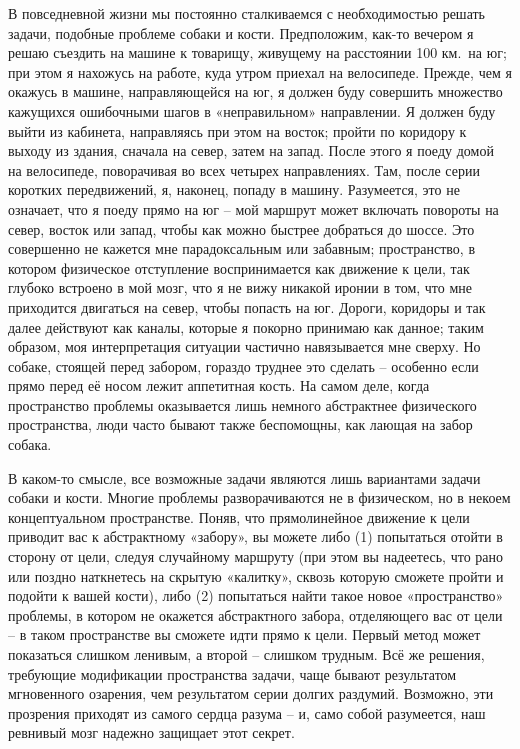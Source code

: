 \documentclass[../main.tex]{subfiles}
\begin{document}
В повседневной жизни мы постоянно сталкиваемся с необходимостью решать задачи, подобные проблеме собаки и кости. Предположим, как-то вечером я решаю съездить на машине к товарищу, живущему на расстоянии 100 км.\ на юг; при этом я нахожусь на работе, куда утром приехал на велосипеде. Прежде, чем я окажусь в машине, направляющейся на юг, я должен буду совершить множество кажущихся ошибочными шагов в «неправильном» направлении. Я должен буду выйти из кабинета, направляясь при этом на восток; пройти по коридору к выходу из здания, сначала на север, затем на запад. После этого я поеду домой на велосипеде, поворачивая во всех четырех направлениях. Там, после серии коротких передвижений, я, наконец, попаду в машину. Разумеется, это не означает, что я поеду прямо на юг \--- мой маршрут может включать повороты на север, восток или запад, чтобы как можно быстрее добраться до шоссе. Это совершенно не кажется мне парадоксальным или забавным; пространство, в котором физическое отступление воспринимается как движение к цели, так глубоко встроено в мой мозг, что я не вижу никакой иронии в том, что мне приходится двигаться на север, чтобы попасть на юг. Дороги, коридоры и так далее действуют как каналы, которые я покорно принимаю как данное; таким образом, моя интерпретация ситуации частично навязывается мне сверху. Но собаке, стоящей перед забором, гораздо труднее это сделать \--- особенно если прямо перед её носом лежит аппетитная кость. На самом деле, когда пространство проблемы оказывается лишь немного абстрактнее физического пространства, люди часто бывают также беспомощны, как лающая на забор собака.

В каком-то смысле, все возможные задачи являются лишь вариантами задачи собаки и кости. Многие проблемы разворачиваются не в физическом, но в некоем концептуальном пространстве. Поняв, что прямолинейное движение к цели приводит вас к абстрактному «забору», вы можете либо (1) попытаться отойти в сторону от цели, следуя случайному маршруту (при этом вы надеетесь, что рано или поздно наткнетесь на скрытую «калитку», сквозь которую сможете пройти и подойти к вашей кости), либо (2) попытаться найти такое новое «пространство» проблемы, в котором не окажется абстрактного забора, отделяющего вас от цели \--- в таком пространстве вы сможете идти прямо к цели. Первый метод может показаться слишком ленивым, а второй \--- слишком трудным. Всё же решения, требующие модификации пространства задачи, чаще бывают результатом мгновенного озарения, чем результатом серии долгих раздумий. Возможно, эти прозрения приходят из самого сердца разума \--- и, само собой разумеется, наш ревнивый мозг надежно защищает этот секрет.
\end{document}
